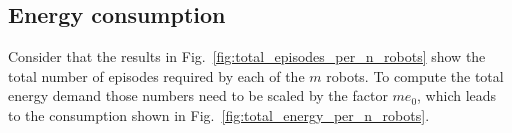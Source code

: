 \subsection{Energy consumption}
Consider that the results in Fig.~\ref{fig:total_episodes_per_n_robots} show the total number of episodes required by each of the $m$ robots. To compute the total energy demand those numbers need to be scaled by the factor $m e_0$, which leads to the consumption shown in Fig.~\ref{fig:total_energy_per_n_robots}.
\begin{figure}[!t]
	\centering
	\hspace*{\fill}
	\hspace*{\fill}
	\\
	\hspace*{\fill}
\end{figure}
